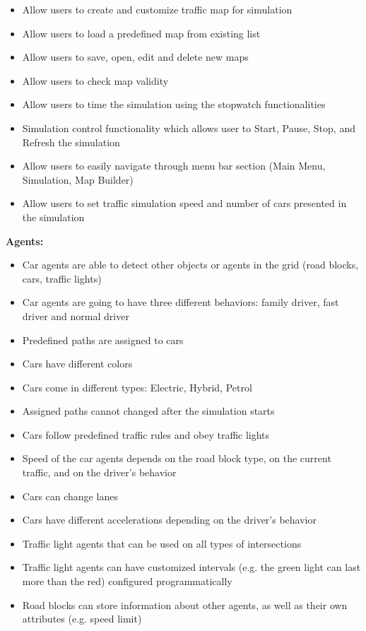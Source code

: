 \documentclass[oneside]{article}
\begin{document}
\begin{itemize}
  \item Allow users to create and customize traffic map for simulation
  \item Allow users to load a predefined map from existing list
  \item Allow users to save, open, edit and delete new maps
  \item Allow users to check map validity 
  \item Allow users to time the simulation using the stopwatch functionalities
  \item Simulation control functionality which allows user to Start, Pause, Stop, and Refresh the simulation
  \item Allow users to easily navigate through menu bar section (Main Menu, Simulation, Map Builder)
  \item Allow users to set traffic simulation speed and number of cars presented in the simulation	  	  
 \end{itemize}
 
\noindent \textbf  {Agents:}
 
 \begin{itemize}
 \item Car agents are able to detect other objects or agents in the grid (road blocks, cars, traffic lights)
 \item Car agents are going to have three different behaviors: family driver, fast driver and normal driver
 \item Predefined paths are assigned to cars 
 \item Cars have different colors
 \item Cars come in different types: Electric, Hybrid, Petrol
 \item Assigned paths cannot changed after the simulation starts
 \item Cars follow predefined traffic rules and obey traffic lights
 \item Speed of the car agents depends on the road block type, on the current traffic, and on the driver's behavior 
 \item Cars can change lanes
 \item Cars have different accelerations depending on the driver's behavior 
 \item Traffic light agents that can be used on all types of intersections
 \item Traffic light agents can have customized intervals (e.g. the green light can last more than the red) configured programmatically
 \item Road blocks can store information about other agents, as well as their own attributes (e.g. speed limit)
 \end{itemize}
 
\end{document}

